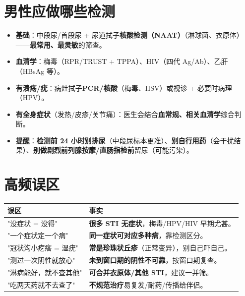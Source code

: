 \documentclass[12pt,UTF8,openany]{ctexbook}
\begin{document}
\section{男性应做哪些检测}

\begin{itemize}[leftmargin=2em,itemsep=0.3em]
  \item \textbf{基础}：中段尿/首段尿 + 尿道拭子\textbf{核酸检测（NAAT）}（淋球菌、衣原体）——\textbf{最常用、最灵敏}的筛查。
  \item \textbf{血清学}：梅毒（RPR/TRUST + TPPA）、HIV（四代 Ag/Ab）、乙肝（HBsAg 等）。
  \item \textbf{有溃疡/疣}：病灶拭子\textbf{PCR/核酸}（梅毒、HSV）或视诊 + 必要时病理（HPV）。
  \item \textbf{有全身症状}（发热/皮疹/关节痛）：医生会结合\textbf{血常规、相关血清学}综合判断。
  \item \textbf{提醒}：\textbf{检测前 24 小时别排尿}（中段尿标本更准）、\textbf{别自行用药}（会干扰结果）、\textbf{别做剧烈前列腺按摩/直肠指检前}留尿（可能污染）。
\end{itemize}

\section{高频误区}

\begin{tabularx}{\textwidth}{l X}
\toprule
\textbf{误区} & \textbf{事实} \\
\midrule
"没症状 = 没得" & \textbf{很多 STI 无症状}，梅毒/HPV/HIV 早期尤甚。 \\
"一个症状定一个病" & \textbf{同一症状可对应多种病}，靠检测区分。 \\
"冠状沟小疙瘩 = 湿疣" & \textbf{常是珍珠状丘疹}（正常变异），别自己吓自己。 \\
"测过一次阴性就放心" & \textbf{未到窗口期的阴性不可靠}，按窗口期复查。 \\
"淋病能好，就不查其他" & \textbf{可合并衣原体/其他 STI}，建议一并筛。 \\
"吃两天药就不去查了" & \textbf{不规范治疗}易复发/耐药/传播给伴侣。 \\
\bottomrule
\end{tabularx}
\end{document}
